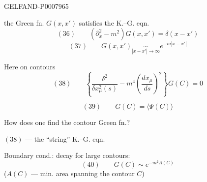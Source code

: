 \begin{GelfandAdjacentEvidence}{GELFAND-P000796}{5}

the Green fn. \(G(x,x')\) satisfies the K.–G. eqn.
\[
(36)\qquad (\partial_x^2-m^2)G(x,x')=\delta(x-x')
\]
\[
(37)\qquad G(x,x')\underset{|x-x'|\to\infty}{\sim}e^{-m|x-x'|}
\]

Here on contours
\[
(38)\qquad \left\{\frac{\delta^2}{\delta x_\mu^2(s)}
-m^4\left(\frac{dx_\mu}{ds}\right)^2\right\}G(C)=0
\]
\end{GelfandAdjacentEvidence}

\[
(39)\qquad G(C)=\langle\Psi(C)\rangle
\]

How does one find the contour Green fn.?

 \((38)\) --- the “string” K.–G. eqn.

Boundary cond.: decay for large contours:
\[
(40)\qquad G(C)\sim e^{-m^2 A(C)}
\]
(\(A(C)\) --- min. area spanning the contour \(C\))


